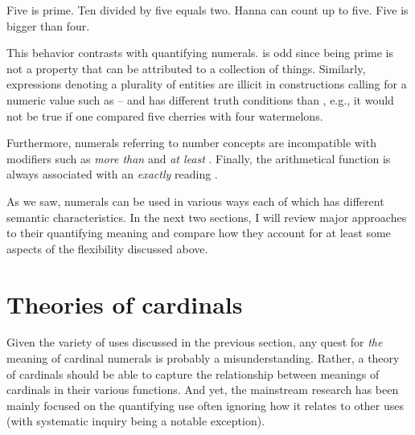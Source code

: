 \documentclass[output=paper]{langscibook}
\begin{document}
\ea \ea Five is prime.\label{ex:arithmetical-prime}
\ex Ten divided by five equals two.\label{ex:arithmetical-math}
\ex Hanna can count up to five.\label{ex:arithmetical-construction}
\ex Five is bigger than four.\label{ex:arithmetical-comparison}
\z
\z

\noindent This behavior contrasts with quantifying numerals.  is odd since being prime is not a property that can be attributed to a collection of things. Similarly, expressions denoting a plurality of entities are illicit in constructions calling for a numeric value such as -- and  has different truth conditions than , e.g., it would not be true if one compared five cherries with four watermelons.

\ea\label{ex:quantifying-arithmetical-properties} \label{ex:quantifying-prime}
\label{ex:quantifying-math}
\label{ex:quantifying-construction}
\label{ex:quantifying-comparison}
\z
\z

\noindent Furthermore, numerals referring to number concepts are incompatible with modifiers such as \textit{more than} and \textit{at least} . Finally, the arithmetical function is always associated with an \textit{exactly} reading .

\ea\label{ex:arithmetical-modifiers-implicatures} \label{ex:arithmetical-modifiers}
\label{ex:arithmetical-implicatures}
\z
\z

\noindent As we saw, numerals can be used in various ways each of which has different semantic characteristics. In the next two sections, I will review major approaches to their quantifying meaning and compare how they account for at least some aspects of the flexibility discussed above.

	\section{Theories of cardinals}\label{sec:theories-of-cardinals}
	
	Given the variety of uses discussed in the previous section, any quest for \textit{the} meaning of cardinal numerals is probably a misunderstanding. Rather, a theory of cardinals should be able to capture the relationship between meanings of cardinals in their various functions. And yet, the mainstream research has been mainly focused on the quantifying use often ignoring how it relates to other uses (with  systematic inquiry being a notable exception).
	
\end{document}
